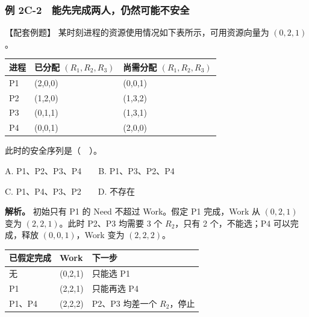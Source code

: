 \subsubsection{例 2C-2　能先完成两人，仍然可能不安全}\label{OS02-ex4-2}

\begin{example}[配套例题]

【配套例题】 某时刻进程的资源使用情况如下表所示，可用资源向量为 \((0,2,1)\)。

\begin{wideblock}

\par\medskip\noindent\begin{minipage}{\linewidth}\fontsize{9.3}{12}\selectfont\begin{tabularx}{\linewidth}{@{}YYY@{}}
\toprule\noalign{}
进程 & 已分配 \((R_1,R_2,R_3)\) & 尚需分配 \((R_1,R_2,R_3)\) \\
\midrule\noalign{}


P1 & (2,0,0) & (0,0,1) \\
P2 & (1,2,0) & (1,3,2) \\
P3 & (0,1,1) & (1,3,1) \\
P4 & (0,0,1) & (2,0,0) \\
\bottomrule\end{tabularx}
\end{minipage}\par\medskip

\end{wideblock}

此时的安全序列是（　）。

A. P1、P2、P3、P4　　B. P1、P3、P2、P4

C. P1、P4、P3、P2　　D. 不存在

\end{example}

\textbf{解析。} 初始只有 P1 的 Need 不超过 Work。假定 P1 完成，Work 从 \((0,2,1)\) 变为 \((2,2,1)\)。此时 P2、P3 均需要 3 个 \(R_2\)，只有 2 个，不能选；P4 可以完成，释放 \((0,0,1)\)，Work 变为 \((2,2,2)\)。

\begin{wideblock}

\par\medskip\noindent\begin{minipage}{\linewidth}\fontsize{9.3}{12}\selectfont\begin{tabularx}{\linewidth}{@{}YYY@{}}
\toprule\noalign{}
已假定完成 & Work & 下一步 \\
\midrule\noalign{}


无 & (0,2,1) & 只能选 P1 \\
P1 & (2,2,1) & 只能再选 P4 \\
P1、P4 & (2,2,2) & P2、P3 均差一个 \(R_2\)，停止 \\
\bottomrule\end{tabularx}
\end{minipage}\par\medskip

\end{wideblock}


